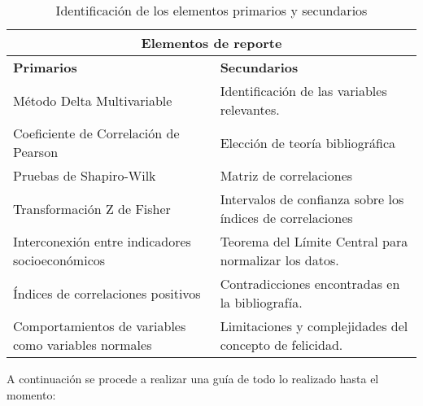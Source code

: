 \begin{table}[H]
    \caption{Identificación de los elementos primarios y secundarios}
    \begin{center}
        \begin{tabular}{  m{7cm}  m{7cm}  }
        \hline
        \multicolumn{2}{c}{\textbf{Elementos de reporte}} \\
        \hline
        \textbf{Primarios} & \textbf{Secundarios} \\
        \hline
        Método Delta Multivariable & Identificación de las variables relevantes.\\ 
        Coeficiente de Correlación de Pearson & Elección de teoría bibliográfica\\ 
        Pruebas de Shapiro-Wilk & Matriz de correlaciones\\
        Transformación Z de Fisher & Intervalos de confianza sobre los índices de correlaciones\\
        Interconexión entre indicadores socioeconómicos & Teorema del Límite Central para normalizar los datos.\\ 
        Índices de correlaciones positivos & Contradicciones encontradas en la bibliografía.\\
        Comportamientos de variables como variables normales & Limitaciones y complejidades del concepto de felicidad.\\
        \hline
        \end{tabular}
    \end{center}
\end{table}

\pagebreak

A continuación se procede a realizar una guía de todo lo realizado hasta el momento:

